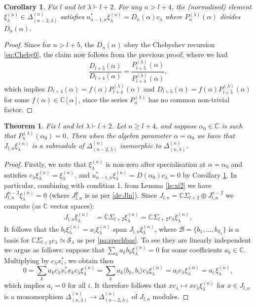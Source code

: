 \documentclass{article}
\newcommand{\ppm}[1]{\textcolor{red}{#1}}
\newcommand{\ppmm}[1]{#1}  %
\newcommand{\bajm}[1]{\textcolor{blue}{#1}}
\newcommand{\bajmm}[1]{#1}
\newtheorem{theorem}{Theorem}[section]
\newtheorem{corollary}{Corollary}[theorem]
\theoremstyle{definition}
\newcommand{\xx}{\alpha}       %
\newcommand{\Deltaa}{\Delta}   %
\newcommand{\Deltaaa}[2]{\Deltaa^{#1}_{#2}}
\def\SS{\mathcal{S}} %
\def\BB{\mathcal{B}} %
\def\a{\alpha}
\def\l{\lambda}
\def\C{\mathbb{C}}
\numberwithin{equation}{subsection}
\begin{document}
\begin{corollary}\label{co:PdivD} Fix $l$ and let $\l\vdash l+2$. For any $n > l+4$, the (normalised) element $\xi^{(n)}_\l\in \Delta^{(n)}_{(n-2,\l)}$ satisfies $u_{n-1,n}^* \xi^{(n)}_\l=D_n(\a) c_\l$ where $P_n^{(\l)}(\a)$ divides $D_n(\a)$.
\end{corollary} 

\begin{proof}
Since for $n>l+5$, the $D_n(\a)$ obey the Chebyshev recursion \eqref{eq:Cheby0}, the claim now follows from the previous proof, where we had
\[\frac{D_{l+5}(\a)}{D_{l+4}(\a)}=\frac{P_{l+5}^{(\l)}(\a)}{P_{l+4}^{(\l)}(\a)},\]
which implies $D_{l+4}(\a)=f(\a) P^{(\l)}_{l+4}(\a)$ and $D_{l+5}(\a)=f(\a) P^{(\l)}_{l+5}(\a)$ for some $f(\a)\in \C[\a]$, since the series $P^{(\l)}_{n}$ has no common non-trivial factor.
\end{proof}


\begin{theorem} Fix $l$ and let $\l\vdash l+2$. Let $n\geq l+4$, and suppose $\a_0\in \C$ is such that $P_n^{(\l)}(\a_0)=0$. 
Then 
\ppmm{when the algebra parameter $\xx=\xx_0$ we have that} 
$J_{l,n} \xi^{(n)}_\l$ is a submodule of $\Delta^{(n)}_{(n-2,\l)}$ isomorphic to $\Delta^{(n)}_{(n,\l)}$. 
\end{theorem} 
\begin{proof} 
Firstly, we note that $\xi^{(n)}_\l$ is non-zero after specialisation at $\a=\a_0$ and satisfies $c_\l \xi^{(n)}_\l=\xi^{(n)}_\l$, and $u_{n-1,n}^* \xi^{(n)}_\l=D(\a_0) c_\l=0$ by Corollary \ref{co:PdivD}. In particular, combining with condition 1. from Lemma \ref{le:xi2} we have $J_{l,n}^{n-2} \xi^{(n)}_{\l}=0$ (where $J_{l,n}^{p}$ is as per \ref{de:Jln}). Since $J_{l,n}=\C \Sigma_{l+2}\oplus J_{l,n}^{n-2}$ we compute (as $\C$ vector spaces):
\begin{align*} J_{l,n}\xi^{(n)}_\l&=\C \Sigma_{l+2} \xi^{(n)}_\l= \C \Sigma_{l+2} c_\l \xi^{(n)}_\l,   
\end{align*}
    It follows that the $b_i \xi^{(n)}_\l= x_i \xi^{(n)}_\l $ span $J_{l,n}\xi^{(n)}_\l$, where $\BB=\{b_1,\dots, b_{d_{\l}}\}$ is a basis for $\C \Sigma_{l+2} c_\l \simeq \SS_\l$ as per \ref{pa:spechbas}. To see they are linearly independent we argue as follows: suppose that $\sum_k a_k b_k \xi^{(n)}_\l=0$ for some coefficients $a_k\in \C$. Multiplying by $c _\l x_{i}^*$, we obtain then
    \[
    0=\sum_k a_k c _\l x_{i}^* x_k c_\l \xi^{(n)}_\l=\sum_k a_k \langle b_k, b_i\rangle c_\l \xi^{(n)}_\l= a_i c_\l \xi^{(n)}_\l =a_i \, \xi^{(n)}_\l,
    \]
    which implies $a_i=0$ for all $i$. It therefore follows that $x c_\l \mapsto x c_\l \xi_\l^{(n)} $ for $x\in J_{l,n}$ is a \bajmm{monomorphism} $\Delta^{(n)}_{(n,\l)}\to \Delta^{(n)}_{(n-2,\l)} $ 
    of $J_{l,n}$ modules. 
    \end{proof}
\end{document}
